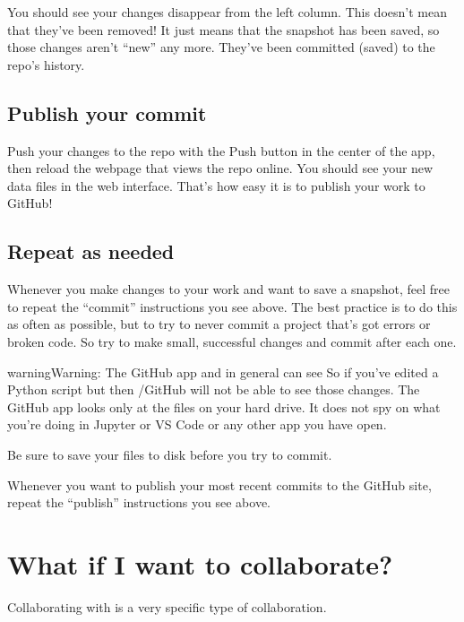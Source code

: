 \documentclass[letterpaper,10pt,english]{sphinxmanual}
\begin{document}
You should see your changes disappear from the left column.  This doesn’t mean that they’ve been removed!  It just means that the snapshot has been saved, so those changes aren’t “new” any more.  They’ve been committed (saved) to the repo’s history.


\subsection{Publish your commit}
\label{\detokenize{chapter-8-version-control:publish-your-commit}}
Push your changes to the repo with the Push button in the center of the app, then reload the webpage that views the repo online.  You should see your new data files in the web interface.  That’s how easy it is to publish your work to GitHub!


\subsection{Repeat as needed}
\label{\detokenize{chapter-8-version-control:repeat-as-needed}}
Whenever you make changes to your work and want to save a snapshot, feel free to repeat the “commit” instructions you see above.  The best practice is to do this as often as possible, but to try to never commit a project that’s got errors or broken code.  So try to make small, successful changes and commit after each one.

\begin{sphinxadmonition}{warning}{Warning:}
The GitHub app and  in general can see   So if you’ve edited a Python script but  then /GitHub will not be able to see those changes.  The GitHub app looks only at the files on your hard drive.  It does not spy on what you’re doing in Jupyter or VS Code or any other app you have open.

  Be sure to save your files to disk before you try to commit.
\end{sphinxadmonition}

Whenever you want to publish your most recent commits to the GitHub site, repeat the “publish” instructions you see above.


\section{What if I want to collaborate?}
\label{\detokenize{chapter-8-version-control:what-if-i-want-to-collaborate}}
Collaborating with  is a very specific type of collaboration.
\end{document}
